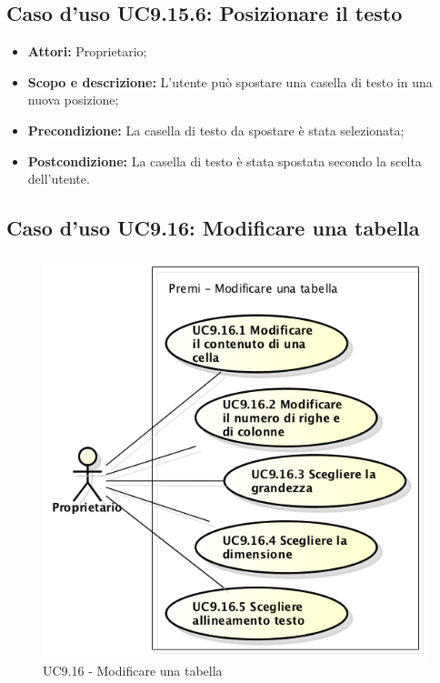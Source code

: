 \subsection{Caso d'uso UC9.15.6: Posizionare il testo}
\begin{itemize}
	\item \textbf{Attori:} Proprietario;
	\item \textbf{Scopo e descrizione:} L'utente può spostare una casella di testo in una nuova posizione;
	\item \textbf{Precondizione:} La casella di testo da spostare è stata selezionata;
	\item \textbf{Postcondizione:} La casella di testo è stata spostata secondo la scelta dell'utente.
\end{itemize}

\newpage
\subsection{Caso d'uso UC9.16: Modificare una tabella}
\begin{figure}[h] 
	\centering 
	\includegraphics[scale=0.45] {img/UC9.16.png}
	\caption{UC9.16 - Modificare una tabella}
\end{figure}

